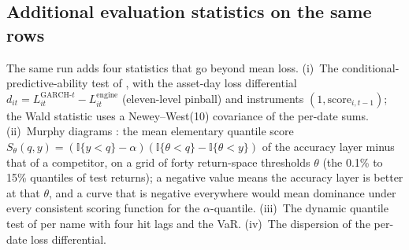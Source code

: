 \documentclass[11pt]{article}
\begin{document}
\subsection*{Additional evaluation statistics on the same rows}
The same run adds four statistics that go beyond mean loss. (i)~The conditional-predictive-ability test of \citet{giacominiwhite2006}, with the asset-day loss differential $d_{it}=L^{\mathrm{GARCH}\text{-}t}_{it}-L^{\mathrm{engine}}_{it}$ (eleven-level pinball) and instruments $(1,\mathrm{score}_{i,t-1})$; the Wald statistic uses a Newey--West(10) covariance of the per-date sums. (ii)~Murphy diagrams \citep{ehm2016}: the mean elementary quantile score $S_\theta(q,y)=(\mathbb{I}\{y<q\}-\alpha)(\mathbb{I}\{\theta<q\}-\mathbb{I}\{\theta<y\})$ of the accuracy layer minus that of a competitor, on a grid of forty return-space thresholds $\theta$ (the 0.1\% to 15\% quantiles of test returns); a negative value means the accuracy layer is better at that $\theta$, and a curve that is negative everywhere would mean dominance under every consistent scoring function for the $\alpha$-quantile. (iii)~The dynamic quantile test of \citet{engle2004caviar} per name with four hit lags and the VaR. (iv)~The dispersion of the per-date loss differential.
\end{document}
